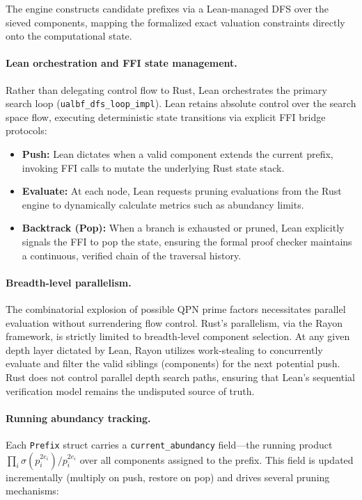 The engine constructs candidate prefixes via a Lean-managed DFS over the
sieved components, mapping the formalized exact valuation
constraints directly onto the computational state.

\paragraph{Lean orchestration and FFI state management.}
Rather than delegating control flow to Rust, Lean orchestrates the primary
search loop (\texttt{ualbf\_\allowbreak{}dfs\_\allowbreak{}loop\_\allowbreak{}impl}). Lean retains absolute control over the search space
flow, executing deterministic state transitions via explicit FFI bridge protocols:
\begin{itemize}
  \item \textbf{Push:} Lean dictates when a valid component extends the current prefix, invoking FFI calls to mutate the underlying Rust state stack.
  \item \textbf{Evaluate:} At each node, Lean requests pruning evaluations from the Rust engine to dynamically calculate metrics such as abundancy limits.
  \item \textbf{Backtrack (Pop):} When a branch is exhausted or pruned, Lean explicitly signals the FFI to pop the state, ensuring the formal proof checker maintains a continuous, verified chain of the traversal history.
\end{itemize}

\paragraph{Breadth-level parallelism.}
The combinatorial explosion of possible QPN prime factors necessitates parallel evaluation without surrendering flow control. Rust's parallelism, via the Rayon framework, is strictly limited to breadth-level component selection. At any given depth layer dictated by Lean, Rayon utilizes work-stealing to concurrently evaluate and filter the valid siblings (components) for the next potential push. Rust does not control parallel depth search paths, ensuring that Lean's sequential verification model remains the undisputed source of truth.

\paragraph{Running abundancy tracking.}
Each \texttt{Prefix} struct carries a
\texttt{current\_\allowbreak{}abundancy} field---the running product
$\prod_{i} \sigma(p_i^{2e_i})/p_i^{2e_i}$ over all components assigned
to the prefix.  This field is updated incrementally (multiply on push,
restore on pop) and drives several pruning mechanisms:

